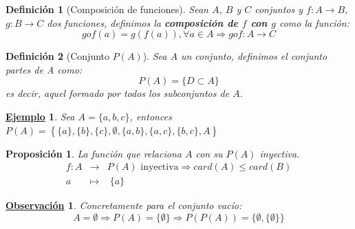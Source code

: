 \documentclass[10pt,a4paper,openright]{book}
\theoremstyle{break}
\newtheorem{defi}{Definición}[chapter]
\newtheorem{prop}{Proposición}[chapter]
\newtheorem{obs}{\underline{Observación}}[chapter]
\newtheorem{ej}{\underline{Ejemplo}}[chapter]
\begin{document}
\begin{defi}[Composición de funciones]
Sean $A$, $B$ y $C$ conjuntos y $f: A\rightarrow B$, $g: B\rightarrow C$ dos funciones, definimos la \textbf{composición de $f$ con $g$} como la función:
$$gof(a)=g\left(f(a)\right),\forall a \in A\Rightarrow gof: A\rightarrow C$$
\end{defi}

\begin{defi}[Conjunto $P(A)$]
Sea $A$ un conjunto, definimos el conjunto \textit{partes de A} como:
$$P(A) = \{D \subset A\}$$
es decir, aquel formado por todos los subconjuntos de $A$.
\end{defi}

\begin{ej}
Sea $A=\{a,b,c\}$, entonces $P(A)=\left\lbrace \{a\}, \{b\},\{c\}, \emptyset, \{a,b\}, \{a,c\}, \{b,c\}, A \right\rbrace$
\end{ej}

\begin{prop}
La función que relaciona $A$ con su $P(A)$ inyectiva.
\begin{eqnarray*}
f: A & \rightarrow & P(A)\mbox{ inyectiva}\Rightarrow card(A)\leq card(B)\\
a & \longmapsto  & \; \{a\}
\end{eqnarray*}
\end{prop}

\begin{obs}
Concretamente para el conjunto vacío:
$$A=\emptyset \Rightarrow P(A)=\{\emptyset\} \Rightarrow P(P(A))=\{\emptyset, \{\emptyset\}\}$$
\end{obs}
\end{document}
